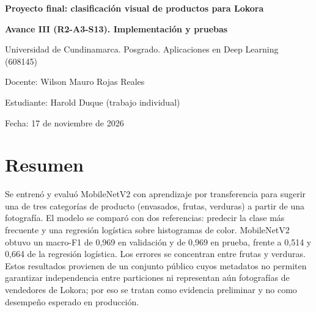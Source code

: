 \documentclass[11pt,a4paper]{article}
\begin{document}
{\LARGE\bfseries Proyecto final: clasificación visual de productos para Lokora\par}\vspace{0.4em}
\noindent \textbf{Avance III (R2-A3-S13). Implementación y pruebas}\par
\noindent Universidad de Cundinamarca. Posgrado. Aplicaciones en Deep Learning (608145)\par
\noindent Docente: Wilson Mauro Rojas Reales\par
\noindent Estudiante: Harold Duque (trabajo individual)\par
\noindent Fecha: 17 de noviembre de 2026\par
\section*{Resumen}
\noindent Se entrenó y evaluó MobileNetV2 con aprendizaje por transferencia para sugerir una de tres categorías de producto (envasados, frutas, verduras) a partir de una fotografía. El modelo se comparó con dos referencias: predecir la clase más frecuente y una regresión logística sobre histogramas de color. MobileNetV2 obtuvo un macro-F1 de 0,969 en validación y de 0,969 en prueba, frente a 0,514 y 0,664 de la regresión logística. Los errores se concentran entre frutas y verduras. Estos resultados provienen de un conjunto público cuyos metadatos no permiten garantizar independencia entre particiones ni representan aún fotografías de vendedores de Lokora; por eso se tratan como evidencia preliminar y no como desempeño esperado en producción.\par
\end{document}
